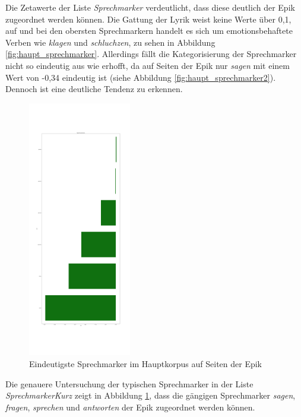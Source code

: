 \documentclass[a4paper,10p]{article}
\begin{document}
Die Zetawerte der Liste \textit{Sprechmarker} verdeutlicht, dass diese deutlich der Epik zugeordnet werden können. Die Gattung der Lyrik weist keine Werte über 0,1, auf und bei den obersten Sprechmarkern handelt es sich um emotionsbehaftete Verben wie \textit{klagen} und \textit{schluchzen}, zu sehen in Abbildung \ref{fig:haupt_sprechmarker}. Allerdings fällt die Kategorisierung der Sprechmarker nicht so eindeutig aus wie erhofft, da auf Seiten der Epik nur \textit{sagen} mit einem Wert von -0,34 eindeutig ist (siehe Abbildung \ref{fig:haupt_sprechmarker2}). Dennoch ist eine deutliche Tendenz zu erkennen. \par 

\begin{figure}
	\includegraphics[width=0.4\textwidth]{haupt_sprechmarkerKurz_pro_wort.png}
	\caption{Eindeutigste Sprechmarker im Hauptkorpus auf Seiten der Epik}
	\label{fig:haupt_sprechmarkerKurz}
\end{figure}


Die genauere Untersuchung der typischen Sprechmarker in der Liste \textit{SprechmarkerKurz} zeigt in Abbildung \ref{fig:haupt_sprechmarkerKurz}, dass die gängigen Sprechmarker \textit{sagen}, \textit{fragen}, \textit{sprechen} und \textit{antworten} der Epik zugeordnet werden können. \par 
\end{document}
